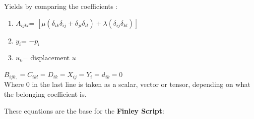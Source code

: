 Yields by comparing the coefficients :

\begin{enumerate}
\item $A_{ijkl}$= $\left[\mu\left(\delta_{ik}\delta_{ij}+\delta_{jl}\delta_{il}\right)+\lambda\left(\delta_{ij}\delta_{kl}\right)\right]$
\item $y_{i}$= $-p_{i}$
\item $u_{k}$= displacement $u$
\end{enumerate}
$B_{ijk,}=C_{ikl}=D_{ik}=X_{ij}=Y_{i}=d_{ik}=0$\\


Where 0 in the last line is taken as a scalar, vector or tensor, depending
on what the belonging coefficient is.

These equations are the base for the \textbf{Finley Script}:

